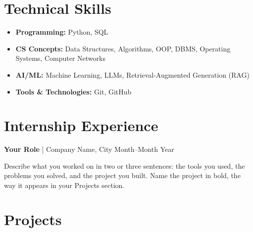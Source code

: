 \documentclass[10.5pt,letterpaper]{article}
\begin{document}

\section{Technical Skills}

\begin{itemize}

\item
\textbf{Programming:}
Python, SQL

\item
\textbf{CS Concepts:}
Data Structures, Algorithms, OOP, DBMS, Operating Systems,
Computer Networks

\item
\textbf{AI/ML:}
Machine Learning, LLMs, Retrieval-Augmented Generation (RAG)

\item
\textbf{Tools \& Technologies:}
Git, GitHub

\end{itemize}


\section{Internship Experience}

\textbf{Your Role} | Company Name, City
\hfill Month--Month Year

Describe what you worked on in two or three sentences: the tools you
used, the problems you solved, and the project you built. Name the
project in bold, the way it appears in your Projects section.


\section{Projects}
\end{document}
